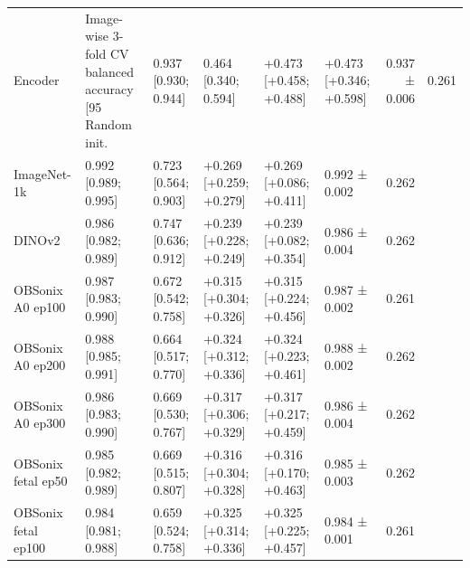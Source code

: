 \begin{tabular}{llllllr}
\toprule
Encoder & Image-wise 3-fold CV balanced accuracy [95%
\midrule
Random init. & 0.937 [0.930; 0.944] & 0.464 [0.340; 0.594] & +0.473 [+0.458; +0.488] & +0.473 [+0.346; +0.598] & 0.937 ± 0.006 & 0.261 \\
ImageNet-1k & 0.992 [0.989; 0.995] & 0.723 [0.564; 0.903] & +0.269 [+0.259; +0.279] & +0.269 [+0.086; +0.411] & 0.992 ± 0.002 & 0.262 \\
DINOv2 & 0.986 [0.982; 0.989] & 0.747 [0.636; 0.912] & +0.239 [+0.228; +0.249] & +0.239 [+0.082; +0.354] & 0.986 ± 0.004 & 0.262 \\
OBSonix A0 ep100 & 0.987 [0.983; 0.990] & 0.672 [0.542; 0.758] & +0.315 [+0.304; +0.326] & +0.315 [+0.224; +0.456] & 0.987 ± 0.002 & 0.261 \\
OBSonix A0 ep200 & 0.988 [0.985; 0.991] & 0.664 [0.517; 0.770] & +0.324 [+0.312; +0.336] & +0.324 [+0.223; +0.461] & 0.988 ± 0.002 & 0.262 \\
OBSonix A0 ep300 & 0.986 [0.983; 0.990] & 0.669 [0.530; 0.767] & +0.317 [+0.306; +0.329] & +0.317 [+0.217; +0.459] & 0.986 ± 0.004 & 0.262 \\
OBSonix fetal ep50 & 0.985 [0.982; 0.989] & 0.669 [0.515; 0.807] & +0.316 [+0.304; +0.328] & +0.316 [+0.170; +0.463] & 0.985 ± 0.003 & 0.262 \\
OBSonix fetal ep100 & 0.984 [0.981; 0.988] & 0.659 [0.524; 0.758] & +0.325 [+0.314; +0.336] & +0.325 [+0.225; +0.457] & 0.984 ± 0.001 & 0.261 \\
\bottomrule
\end{tabular}
